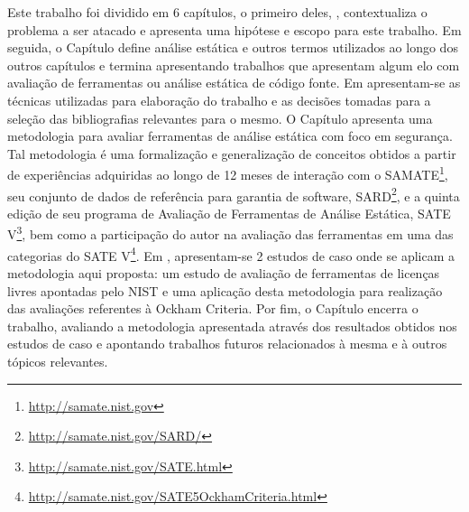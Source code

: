 Este trabalho foi dividido em 6 capítulos, o primeiro deles, , contextualiza o problema a ser atacado e apresenta uma hipótese e escopo para este trabalho. Em seguida, o Capítulo  define análise estática e outros termos utilizados ao longo dos outros capítulos e termina apresentando trabalhos que apresentam algum elo com avaliação de ferramentas ou análise estática de código fonte. Em  apresentam-se as técnicas utilizadas para elaboração do trabalho e as decisões tomadas para a seleção das bibliografias relevantes para o mesmo. O Capítulo  apresenta uma metodologia para avaliar ferramentas de análise estática com foco em segurança. Tal metodologia é uma formalização e generalização de conceitos obtidos  a partir de experiências adquiridas ao longo de 12 meses de interação com o SAMATE\footnote{\url{http://samate.nist.gov}}, seu conjunto de dados de referência para garantia de software, SARD\footnote{\url{http://samate.nist.gov/SARD/}}, e a quinta edição de seu programa de Avaliação de Ferramentas de Análise Estática, SATE V\footnote{\url{http://samate.nist.gov/SATE.html}}, bem como a participação do autor na avaliação das ferramentas em uma das categorias do SATE V\footnote{\url{http://samate.nist.gov/SATE5OckhamCriteria.html}}. Em , apresentam-se 2 estudos de caso onde se aplicam a metodologia aqui proposta: um estudo de avaliação de ferramentas de licenças livres apontadas pelo NIST e uma aplicação desta metodologia para realização das avaliações referentes à Ockham Criteria. Por fim, o Capítulo  encerra o trabalho, avaliando a metodologia apresentada através dos resultados obtidos nos estudos de caso e apontando trabalhos futuros relacionados à mesma e à outros tópicos relevantes.

